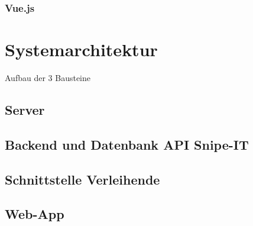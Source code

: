 \subsubsection{Vue.js}

\section{Systemarchitektur}
Aufbau der 3 Bausteine

\subsection{Server}


\subsection{Backend und Datenbank API Snipe-IT}

\subsection{Schnittstelle Verleihende}

\subsection{Web-App}

